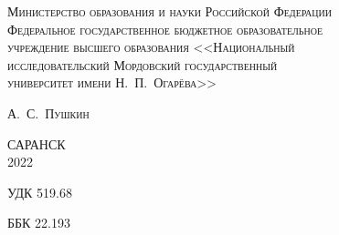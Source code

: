 \begin{titlepage}
	\centering
	{\scshape Министерство образования и науки Российской Федерации\\ 
		Федеральное государственное бюджетное образовательное\\
		учреждение высшего образования <<Национальный\\
		исследовательский Мордовский государственный\\
		университет имени Н.~П.~Огарёва>>\par}
	\vspace{5cm}
	\vfill
	{\huge\bfseries\LARGE \zhrvTitle\par}
	\vspace{5cm}
	{\scshape\Large А.~С.~Пушкин\par}
	\vspace{2cm}
	\vfill
	
	{\large САРАНСК\\2022\par}
\end{titlepage}

\newpage
\thispagestyle{empty}
УДК 519.68

ББК 22.193

